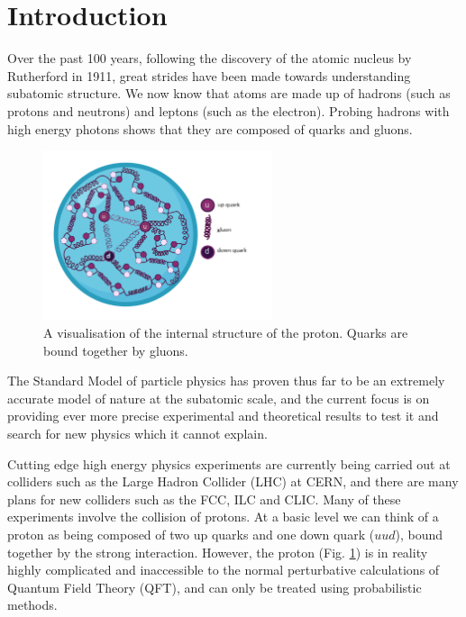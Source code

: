 \documentclass[a4paper,12pt,oneside,openright]{book}
\numberwithin{equation}{section}
\numberwithin{figure}{section}
\numberwithin{table}{section}
\begin{document}
\section*{Introduction} %
Over the past 100 years, following the discovery of the atomic nucleus by Rutherford in 1911, great
strides have been made towards understanding subatomic structure. We now know that atoms are made up of hadrons (such as protons and neutrons) and leptons
(such as the electron). Probing hadrons with high energy photons shows that
they are composed of quarks and gluons.
\begin{figure}[H]
\label{fig:proton}
\centering
\includegraphics[width=0.6\textwidth]{proton.pdf}
\caption{A visualisation of the internal structure of the proton. Quarks are bound together by gluons.}
\end{figure}

The Standard Model of particle physics has proven thus
far to be an extremely accurate  model of nature at the subatomic scale, and the current focus is on providing ever more precise
experimental and theoretical results to test it and search for new physics which it cannot explain.

Cutting edge high energy physics experiments are currently being carried out at colliders such as the Large Hadron Collider
(LHC) at CERN, and there are many plans for new colliders such as the FCC, ILC and CLIC. Many of these experiments involve the collision of protons. At a basic level we can think of
a proton as being composed of two up quarks and one down quark ($uud$), bound together by the strong
interaction. However, the proton (Fig. \ref{fig:proton}) is in reality
highly complicated and inaccessible to the normal perturbative calculations of Quantum Field Theory (QFT), and can only be treated using probabilistic methods. 
\end{document}

